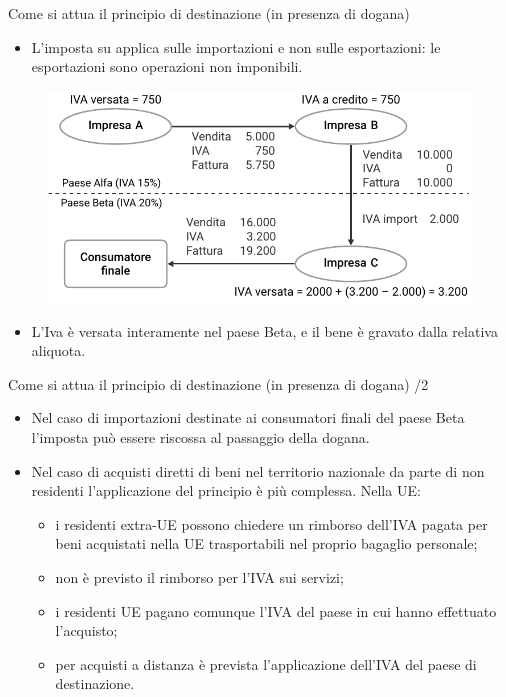 \documentclass[aspectratio=64,11pt]{beamer}
\begin{document}
\begin{frame}{Come si attua il principio di destinazione (in presenza di dogana)}

  \begin{itemize}
  \item L'imposta su applica sulle importazioni e non sulle esportazioni: le
    esportazioni sono operazioni \alert{non imponibili}.
  \end{itemize}

  \begin{figure}\centering
    \includegraphics[width=.8\textwidth]{./figure/IVA-destinazione.pdf}
  \end{figure}

  \begin{itemize}
  \item L'Iva è versata interamente nel paese Beta, e il bene è gravato dalla
    relativa aliquota.
  \end{itemize}
\end{frame}

\begin{frame}{Come si attua il principio di destinazione (in presenza di dogana) /2}

  \begin{itemize}
  \item Nel caso di \alert{importazioni destinate ai consumatori finali} del paese
    Beta l'imposta può essere riscossa al passaggio della dogana.
  \item Nel caso di \alert{acquisti diretti} di beni nel territorio nazionale da parte
    di non residenti l'applicazione del principio è più complessa. Nella UE:
    \begin{itemize}
    \item i residenti extra-UE possono chiedere un rimborso dell'IVA pagata
      per beni acquistati nella UE trasportabili nel proprio bagaglio
      personale;
    \item non è previsto il rimborso per l'IVA sui servizi;
    \item i residenti UE pagano comunque l'IVA del paese in cui hanno
      effettuato l'acquisto;
    \item per acquisti a distanza è prevista l'applicazione dell'IVA del paese
      di destinazione.
\end{itemize}
\end{itemize}
\end{frame}
\end{document}
